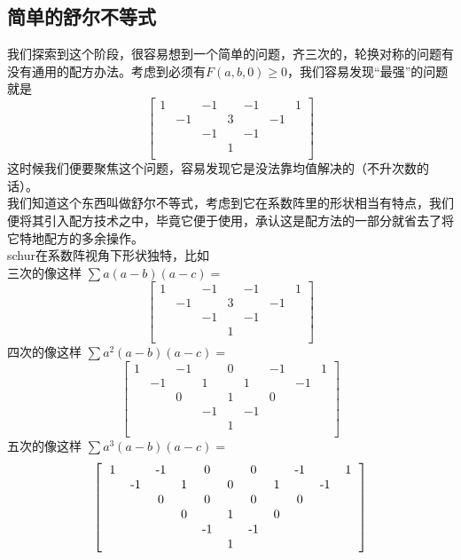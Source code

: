 \documentclass[UTF8]{ctexart}
\begin{document}
\subsection{简单的舒尔不等式}
我们探索到这个阶段，很容易想到一个简单的问题，齐三次的，轮换对称的问题有没有通用的配方办法。考虑到必须有$ F(a,b,0) \geq 0 $，我们容易发现“最强”的问题就是
\renewcommand*{\arraystretch}{1.732}\[\left[\begin{matrix}
	1& &-1& &-1& &1\\
	&-1& &3& &-1&\\
	& &-1& &-1& & \\
	& & &1& & &\\
\end{matrix}\right]\]
这时候我们便要聚焦这个问题，容易发现它是没法靠均值解决的（不升次数的话）。\\
我们知道这个东西叫做舒尔不等式，考虑到它在系数阵里的形状相当有特点，我们便将其引入配方技术之中，毕竟它便于使用，承认这是配方法的一部分就省去了将它特地配方的多余操作。\\
schur在系数阵视角下形状独特，比如
\\三次的像这样
$ \displaystyle \sum a(a-b)(a-c)= $
\renewcommand*{\arraystretch}{1.732}\[\left[\begin{matrix}
	1& &-1& &-1& &1\\
	&-1& &3& &-1&\\
	& &-1& &-1& & \\
	& & &1& & &\\
\end{matrix}\right]\]
四次的像这样
$ \displaystyle \sum a^{2}(a-b)(a-c)= $
\renewcommand*{\arraystretch}{1.732}\[\left[\begin{matrix}
	1& &-1& &0& &-1& &1\\
	&-1& &1& &1& &-1&\\
	& &0& &1& &0& &\\
	& & &-1& &-1& & &\\
	& & & &1& & & &\\
\end{matrix}\right]\]
五次的像这样
$ \displaystyle \sum a^{3}(a-b)(a-c)= $
\renewcommand*{\arraystretch}{1.732}\[\left[\begin{matrix}
	\begin{tabular}{ccccccccccccc}
		1& &-1& &0& &0& &-1& &1\\
		&-1& &1& &0& &1& &-1&\\
		& &0& &0& &0& &0& &\\
		& & &0& &1& &0& & &\\
		& & & &-1& &-1& & & &\\
		& & & & &1& & & & &\\
	\end{tabular}
\end{matrix}\right]\]
\end{document}
